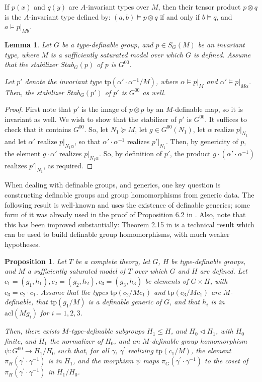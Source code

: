 \documentclass[12pt]{article}
\newcommand{\tpp}{\mathrm{tp}}
\newcommand{\acl}{\mathrm{acl}}
\newcommand{\0}{\emptyset}
\theoremstyle{plain}%
\newtheorem{lem}[thm]{Lemma}
\newtheorem{prop}[thm]{Proposition}
\theoremstyle{definition}
\theoremstyle{remark}
\begin{document}
If $p(x)$ and $q(y)$ are $A$-invariant types over $M$, then their tensor product $p\otimes q$ is the $A$-invariant type defined by: $(a,b)\models p\otimes q$ if and only if $b\models q$, and $a\models p|_{Mb}$. 

\begin{lem}\label{lemma_indep_products_of_generics}
    Let $G$ be a type-definable group, and $p \in S_G(M)$ be an invariant type, where $M$ is a sufficiently saturated model over which $G$ is defined. Assume that the stabilizer $Stab_G(p)$ of $p$ is $G^{00}$. 

    Let $p '$ denote the invariant type $\tpp(\alpha ' \cdot \alpha^{-1} / M)$, where $\alpha \models p|_M$ and $\alpha ' \models p|_{M \alpha}$. Then, the stabilizer $Stab_G(p')$ of $p '$ is $G^{00}$ as well.
\end{lem}

\begin{proof}
First note that $p '$ is the image of $p \otimes p$ by an $M$-definable map, so it is invariant as well. We wish to show that the stabilizer of $p '$ is $G^{00}$. It suffices to check that it contains $G^{00}$. So, let $N_1 \succeq M$, let $g \in G^{00}(N_1)$, let $\alpha$ realize $p|_{N_1}$ and let $\alpha '$ realize $p|_{N_1\alpha}$, so that $\alpha ' \cdot \alpha^{-1}$ realizes $p '|_{N_1}$. Then, by genericity of $p$, the element $g\cdot \alpha '$ realizes $p|_{N_1\alpha}$. So, by definition of $p '$, the product $g \cdot (\alpha ' \cdot \alpha^{-1})$ realizes $p '|_{N_1}$, as required.
\end{proof}


When dealing with definable groups, and generics, one key question is constructing definable groups and group homomorphisms from generic data. The following result is well-known and uses the existence of definable generics; some form of it was already used in the proof of Proposition 6.2 in \cite{HruPil-GpPFF}. Also, note that this has been improved substantially: Theorem 2.15 in \cite{MOS20} is a technical result which can be used to build definable group homomorphisms, with much weaker hypotheses.

\begin{prop}\label{prop_stabilizer_definable_types}
    Let $T$ be a complete theory, let $G$, $H$ be type-definable groups, and $M$ a sufficiently saturated model of $T$ over which $G$ and $H$ are defined. Let $c_1= (g_1, h_1), c_2=(g_2, h_2), c_3=(g_3, h_3)$ be elements of $G \times H$, with $c_3 = c_2 \cdot c_1$. Assume that the types $\tpp(c_2/ M c_1)$ and $\tpp(c_3 / M c_1)$ are $M$-definable, that $\tpp(g_1 / M)$ is a definable generic of $G$, and that $h_i$ is in $\acl(M g_i)$ for $i=1,2,3$. 


    Then, there exists $M$-type-definable subgroups $H_1 \leq H$, and $H_0 \lhd H_1$, with $H_0$ finite, and $H_1$ the normalizer of $H_0$, and an $M$-definable group homomorphism $\psi: G^{00} \rightarrow H_1 / H_0$ such that, for all $\gamma$, $\gamma^{'}$ realizing $\tpp(c_1 / M)$, the element $\pi_H(\gamma^{'} \cdot \gamma^{-1})$ is in $H_1$, and the morphism $\psi$ maps $\pi_G(\gamma^{'} \cdot \gamma^{-1})$ to the coset of $\pi_H(\gamma^{'} \cdot \gamma^{-1})$ in $H_1 / H_0$.
\end{prop}
\end{document}
